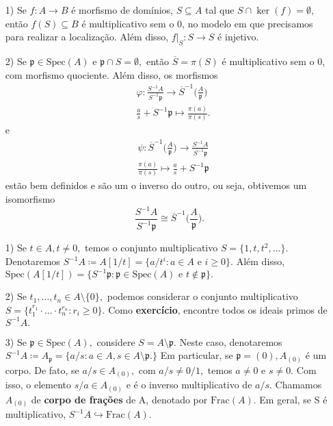 \documentclass[AlgebraII/algebraII_notes.tex]{subfiles}
\begin{document}
\begin{prop*}[Exercício]
	\begin{itemize}
		\item[1)] Se \(f:A\rightarrow B\) é morfismo de domínios, \(S\subseteq A\) tal que \(S\cap\ker{(f)} = \emptyset\), então
		      \(f(S)\subseteq B\) é multiplicativo sem o 0, no modelo em que precisamos para realizar a localização. Além disso, \(f|_S:S\rightarrow S\)
		      é injetivo.
		\item[2)] Se \(\mathfrak{p}\in \mathrm{Spec}(A)\) e \(\mathfrak{p}\cap S = \emptyset,\) então \(\overline{S} = \pi (S)\) é multiplicativo sem o 0, com
		      morfismo quociente. Além disso, os morfismos
		      \begin{align*}
			       & \varphi :\frac{S^{-1}A}{S^{-1}\mathfrak{p}}\rightarrow \overline{S}^{-1}\biggl(\frac{A}{\mathfrak{p}}\biggr) \\
			       & \frac{a}{s}+S^{-1}\mathfrak{p}\mapsto \frac{\pi (a)}{\pi (s)}.
		      \end{align*}
		      e
		      \begin{align*}
			       & \psi:\overline{S}^{-1}\biggl(\frac{A}{\mathfrak{p}}\biggr)\rightarrow \frac{S^{-1}A}{S^{-1}\mathfrak{p}} \\
			       & \frac{\pi (a)}{\pi (s)}\mapsto \frac{a}{s} + S^{-1}\mathfrak{p}
		      \end{align*}
		      estão bem definidos e são um o inverso do outro, ou seja, obtivemos um isomorfismo
		      \[
			      \frac{S^{-1}A}{S^{-1}\mathfrak{p}}\cong{\overline{S}^{-1}\biggl(\frac{A}{\mathfrak{p}}\biggr)}.
		      \]
	\end{itemize}
\end{prop*}
\begin{example}
	\begin{itemize}
		\item[1)] Se \(t\in A, t\neq0,\) temos o conjunto multiplicativo \(S=\{1, t, t^{2}, \dotsc\}\).
		      Denotaremos \(S^{-1}A\coloneqq A[1/t] = \{a/t^{i}: a\in A \text{ e } i\geq 0\}\). Além disso,
		      \(\mathrm{Spec}(A[1/t]) = \{S^{-1}\mathfrak{p}:\mathfrak{p}\in \mathrm{Spec}(A) \text{ e }t\not\in \mathfrak{p}\}.\)
		\item[2)] Se \(t_{1}, \dotsc, t_{n}\in A\setminus{\{0\}},\) podemos considerar o conjunto multiplicativo \(S = \{t_{1}^{r_{1}}\cdot \dotsc \cdot t_{n}^{r_{n}}: r_{i}\geq 0\}.\)
		      Como \textbf{exercício}, encontre todos os ideais primos de \(S^{-1}A.\)
		\item[3)] Se \(\mathfrak{p}\in \mathrm{Spec}(A),\) considere \(S = A\setminus{\mathfrak{p}}.\) Neste caso, denotaremos
		      \(S^{-1}A\coloneqq A_{\mathfrak{p}} = \{a/s: a\in A, s\in A\setminus{\mathfrak{p}}.\}\) Em particular, se \(\mathfrak{p}=(0), A_{(0)}\)
		      é um corpo. De fato, se \(a/s\in A_{(0)},\) com \(a/s\neq0/1,\) temos \(a\neq0\) e \(s\neq0.\) Com isso, o elemento
		      \(s/a\in A_{(0)}\) e é o inverso multiplicativo de \(a/s\). Chamamos \(A_{(0)}\) de \textbf{corpo de frações} de A,
		      denotado por \(\mathrm{Frac}(A).\) Em geral, se S é multiplicativo, \(S^{-1}A\hookrightarrow \mathrm{Frac}(A).\)
	\end{itemize}
\end{example}
\end{document}
